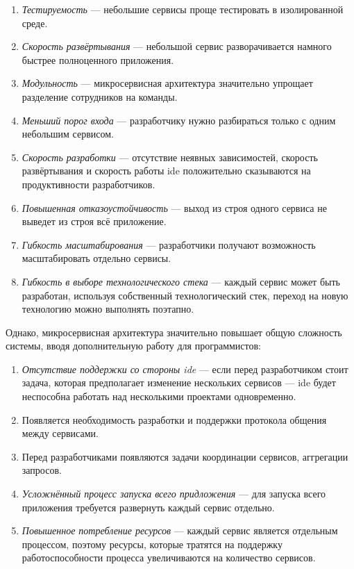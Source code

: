 \begin{enumerate}
	\item \textit{Тестируемость} --- небольшие сервисы проще тестировать в изолированной среде.
	\item \textit{Скорость развёртывания} --- небольшой сервис разворачивается намного быстрее полноценного приложения.
	\item \textit{Модульность} --- микросервисная архитектура значительно упрощает разделение сотрудников на команды.
	\item \textit{Меньший порог входа} --- разработчику нужно разбираться только с одним небольшим сервисом.
	\item \textit{Скорость разработки} --- отсутствие неявных зависимостей, скорость развёртывания и скорость работы \gls{ide} положительно сказываются на продуктивности разработчиков.
	\item \textit{Повышенная отказоустойчивость} --- выход из строя одного сервиса не выведет из строя всё приложение.
	\item \textit{Гибкость масштабирования} --- разработчики получают возможность масштабировать отдельно сервисы.
	\item \textit{Гибкость в выборе технологического стека} --- каждый сервис может быть разработан, используя собственный технологический стек, переход на новую технологию можно выполнять поэтапно.
\end{enumerate}

Однако, микросервисная архитектура значительно повышает общую сложность системы, вводя дополнительную работу для программистов:

\begin{enumerate}
	\item \textit{Отсутствие поддержки со стороны \gls{ide}} --- если перед разработчиком стоит задача, которая предполагает изменение нескольких сервисов --- \gls{ide} будет неспособна работать над несколькими проектами одновременно.
	\item Появляется необходимость разработки и поддержки протокола общения между сервисами.
	\item Перед разработчиками появляются задачи координации сервисов, аггрегации запросов.
	\item \textit{Усложнённый процесс запуска всего придложения} --- для запуска всего приложения требуется развернуть каждый сервис отдельно.
	\item \textit{Повышенное потребление ресурсов} --- каждый сервис является отдельным процессом, поэтому ресурсы, которые тратятся на поддержку работоспособности процесса увеличиваются на количество сервисов.
\end{enumerate}


